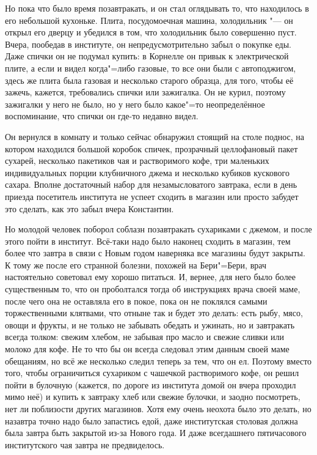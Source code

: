 Но пока что было время позавтракать, и он стал оглядывать то, что находилось в
его небольшой кухоньке.
Плита, посудомоечная машина, холодильник "--- он открыл его дверцу и убедился в
том, что холодильник было совершенно пуст.
Вчера, пообедав в институте, он непредусмотрительно забыл о покупке еды.
Даже спички он не подумал купить: в Корнелле он привык к электрической плите, а
если и видел когда"=либо газовые, то все они были с автоподжигом, здесь же плита
была газовая и несколько старого образца, для того, чтобы её зажечь, кажется,
требовались спички или зажигалка.
Он не курил, поэтому зажигалки у него не было, но у него было какое"=то
неопределённое воспоминание, что спички он где-то недавно видел.

Он вернулся в комнату и только сейчас обнаружил стоящий на столе поднос, на
котором находился большой коробок спичек, прозрачный целлофановый пакет
сухарей, несколько пакетиков чая и растворимого кофе, три маленьких
индивидуальных порции клубничного джема и несколько кубиков кускового сахара.
Вполне достаточный набор для незамысловатого завтрака, если в день приезда
посетитель института не успеет сходить в магазин или просто забудет это сделать,
как это забыл вчера Константин.

Но молодой человек поборол соблазн позавтракать сухариками с джемом, и после
этого пойти в институт.
Всё-таки надо было наконец сходить в магазин, тем более что завтра в связи с
Новым годом наверняка все магазины будут закрыты.
К тому же после его странной болезни, похожей на Бери"=Бери, врач настоятельно
советовал ему хорошо питаться.
И, вернее, для него было более существенным то, что он проболтался тогда об
инструкциях врача своей маме, после чего она не оставляла его в покое, пока он
не поклялся самыми торжественными клятвами, что отныне так и будет это делать:
есть рыбу, мясо, овощи и фрукты, и не только не забывать обедать и ужинать, но и
завтракать всегда толком: свежим хлебом, не забывая про масло и свежие сливки
или молоко для кофе.
Не то что бы он всегда следовал этим данным своей маме обещаниям, но всё же
несколько следил теперь за тем, что он ел.
Поэтому вместо того, чтобы ограничиться сухариком с чашечкой растворимого кофе,
он решил пойти в булочную (кажется, по дороге из института домой он вчера
проходил мимо неё) и купить к завтраку хлеб или свежие булочки, и заодно
посмотреть, нет ли поблизости других магазинов.
Хотя ему очень неохота было это делать, но назавтра точно надо было запастись
едой, даже институтская столовая должна была завтра быть закрытой из-за Нового
года.
И даже всегдашнего пятичасового институтского чая завтра не предвиделось.

